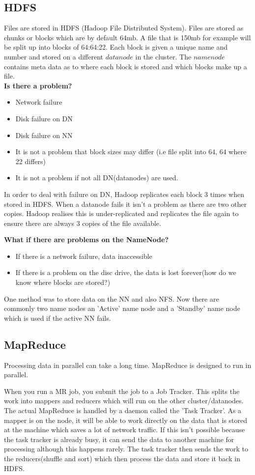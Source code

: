 \documentclass[11pt]{article}
\begin{document}
\subsection{HDFS}
Files are stored in HDFS (Hadoop File Distributed System). Files are stored as chunks or blocks which are by default 64mb. A file that is 150mb for example will be split up into blocks of 64:64:22.
Each block is given a unique name and number and stored on a different $data node$ in the cluster. The $namenode$ contains meta data as to where each block is stored and which blocks make up a file.\\
\textbf{Is there a problem?}
\begin{itemize}
\item Network failure
\item Disk failure on DN
\item Disk failure on NN
\item It is not a problem that block sizes may differ (i.e file split into 64, 64 where 22 differs)
\item It is not a problem if not all DN(datanodes) are used.
\end{itemize}

In order to deal with failure on DN, Hadoop replicates each block 3 times when stored in HDFS. When a datanode fails it isn't a problem as there are two other copies. Hadoop realises this is under-replicated and replicates the file again to ensure there are always 3 copies of the file available.

\textbf{What if there are problems on the NameNode?}
\begin{itemize}
\item If there is a network failure, data inaccessible
\item If there is a problem on the disc drive, the data is lost forever(how do we know where blocks are stored?)
\end{itemize}

One method was to store data on the NN and also NFS. Now there are commonly two name nodes an 'Active' name node and a 'Standby' name node which is used if the active NN fails.

\subsection{MapReduce}
Processing data in parallel can take a long time. MapReduce is designed to run in parallel. 

When you run a MR job, you submit the job to a Job Tracker. This splits the work into mappers and reducers which will run on the other cluster/datanodes. The actual MapReduce is handled by a daemon called the 'Task Tracker'. As a mapper is on the node, it will be able to work directly on the data that is stored at the machine which saves a lot of network traffic. If this isn't possible because the task tracker is already busy, it can send the data to another machine for processing although this happens rarely. The task tracker then sends the work to the reducers(shuffle and sort) which then process the data and store it back in HDFS.  
\end{document}
